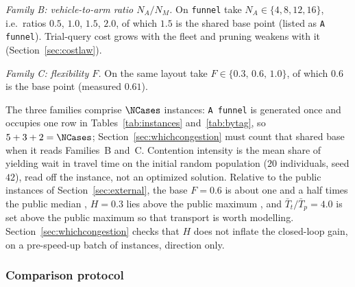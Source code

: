 \emph{Family B: vehicle-to-arm ratio $N_A/N_M$.}
On \texttt{funnel} take $N_A\in\{4,8,12,16\}$, i.e.\ ratios $0.5$, $1.0$, $1.5$, $2.0$, of which $1.5$ is the shared base point (listed as \texttt{A funnel}).
Trial-query cost grows with the fleet and pruning weakens with it (Section~\ref{sec:costlaw}).

\emph{Family C: flexibility $F$.}
On the same layout take $F\in\{0.3,\,0.6,\,1.0\}$, of which $0.6$ is the base point (measured $0.61$).

The three families comprise $\NCases$ instances: \texttt{A funnel} is generated once and occupies one row in Tables~\ref{tab:instances} and~\ref{tab:bytag}, so $5+3+2=\NCases$; Section~\ref{sec:whichcongestion} must count that shared base when it reads Families~B and~C.
Contention intensity is the mean share of yielding wait in travel time on the initial random population ($20$ individuals, seed $42$), read off the instance, not an optimized solution.
Relative to the \PubNInst{} public instances of Section~\ref{sec:external}, the base $F=0.6$ is about one and a half times the public median \PubFMed{}, $H=0.3$ lies above the public maximum \PubHMax{}, and $\bar{T}_t/\bar{T}_p=4.0$ is set above the public maximum \PubTtTpHi{} so that transport is worth modelling.
Section~\ref{sec:whichcongestion} checks that $H$ does not inflate the closed-loop gain, on a pre-speed-up batch of \MatrixCells{} instances, direction only.

\begin{table}[t]
\caption{Controlled instances.
Shared core: $12$ jobs, $36$ operations, $8$ arms, $H=0.3$, $\bar{T}_t/\bar{T}_p\approx4.0$.
Contention intensity is yielding wait as a share of travel time on the initial random population.}
\label{tab:instances}
\small

\end{table}

\subsubsection{Comparison protocol}
\label{sec:protocol}


